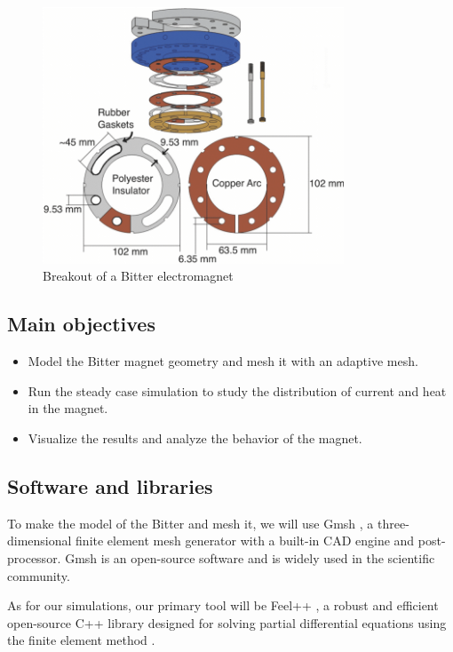 \documentclass[12pt]{article}
\begin{document}
\begin{figure}[H]
  \centering
  \includegraphics[width=0.8\textwidth]{images/Bitter-electromagnet-breakout.png}
  \caption{Breakout of a Bitter electromagnet \cite{bitter_breakout}}
\end{figure}

\subsection{Main objectives}

\begin{itemize}
  \item Model the Bitter magnet geometry and mesh it with an adaptive mesh.
  \item Run the steady case simulation to study the distribution of current and heat in the magnet.
  \item Visualize the results and analyze the behavior of the magnet.
\end{itemize}

\subsection{Software and libraries}
To make the model of the Bitter and mesh it, we will use Gmsh \cite{geuzaine_gmsh_2009}, a three-dimensional
finite element mesh generator with a built-in CAD engine and post-processor.
Gmsh is an open-source software and is widely used in the scientific
community.

As for our simulations, our primary tool will be Feel++ \cite{christophe_prudhomme_feelppfeelpp_2024}, a robust and
efficient open-source C++ library designed for solving partial differential equations using
the finite element method \cite{fem}.
\end{document}
